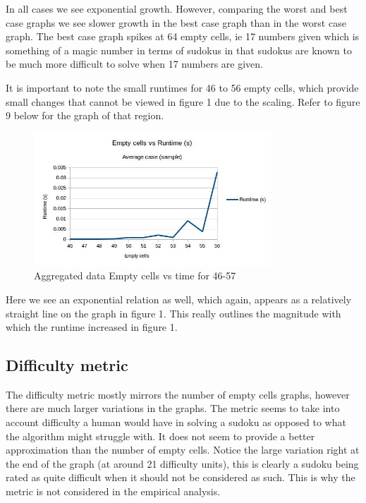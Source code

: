 \documentclass{article}
\begin{document}
In all cases we see exponential growth. However, comparing the worst and best case graphs we see slower growth in the best case graph than in the worst case graph. The best case graph spikes at 64 empty cells, ie 17 numbers given which is something of a magic number in terms of sudokus in that sudokus are known to be much more difficult to solve when 17 numbers are given.

It is important to note the small runtimes for 46 to 56 empty cells, which provide small changes that cannot be viewed in figure 1 due to the scaling. Refer to figure 9 below for the graph of that region.

\begin{figure}[H]
	\includegraphics[width=0.9\linewidth, height=5cm]{graphs_outputs/EmptycellsVSTimeAverage(Sample).jpg}
	\caption{Aggregated data Empty cells vs time for 46-57}
\end{figure}

Here we see an exponential relation as well, which again, appears as a relatively straight line on the graph in figure 1. This really outlines the magnitude with which the runtime increased in figure 1.

\newpage

\subsection{Difficulty metric}
The difficulty metric mostly mirrors the number of empty cells graphs, however there are much larger variations in the graphs. The metric seems to take into account difficulty a human would have in solving a sudoku as opposed to what the algorithm might struggle with. It does not seem to provide a better approximation than the number of empty cells. Notice the large variation right at the end of the graph (at around 21 difficulty units), this is clearly a sudoku being rated as quite difficult when it should not be considered as such. This is why the metric is not considered in the empirical analysis.
\end{document}

